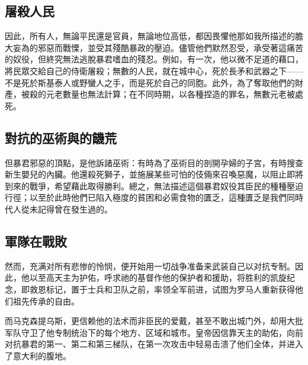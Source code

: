 
\subsection{屠殺人民}

因此，所有人，無論平民還是官員，無論地位高低，都因畏懼他那如我所描述的膽大妄為的邪惡而戰慄，並受其殘酷暴政的壓迫。儘管他們默然忍受，承受著這痛苦的奴役，但終究無法逃脫暴君嗜血的殘忍。例如，有一次，他以微不足道的藉口，將民眾交給自己的侍衛屠殺；無數的人民，就在城中心，死於長矛和武器之下——不是死於斯基泰人或野蠻人之手，而是死於自己的同胞。此外，為了奪取他們的財產，被殺的元老數量也無法計算；在不同時期，以各種捏造的罪名，無數元老被處死。\par


\subsection{對抗的巫術與的饑荒}

但暴君邪惡的頂點，是他訴諸巫術：有時為了巫術目的剖開孕婦的子宮，有時搜查新生嬰兒的內臟。他還殺死獅子，並施展某些可怕的伎倆來召喚惡魔，以阻止即將到來的戰爭，希望藉此取得勝利。總之，無法描述這個暴君奴役其臣民的種種壓迫行徑；以至於此時他們已陷入極度的貧困和必需食物的匱乏，這種匱乏是我們同時代人從未記得曾在發生過的。\par


\subsection{軍隊在戰敗}

然而，充满对所有悲惨的怜悯，便开始用一切战争准备来武装自己以对抗专制。因此，他以至高天主为护佑，呼求祂的基督作他的保护者和援助，将胜利的凯旋纪念，即救恩标记，置于士兵和卫队之前，率领全军前进，试图为罗马人重新获得他们祖先传承的自由。\par

而马克森提乌斯，更信赖他的法术而非臣民的爱戴，甚至不敢出城门外，却用大批军队守卫了他专制统治下的每个地方、区域和城市。皇帝因信靠天主的助佑，向前对抗暴君的第一、第二和第三梯队，在第一次攻击中轻易击溃了他们全体，并进入了意大利的腹地。\par

